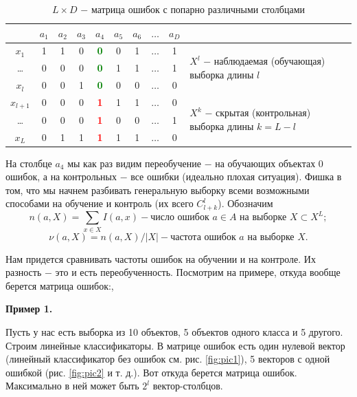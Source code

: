 \begin{table}[hbt!]
    \begin{tabular}{c|cccccccc|p{5cm}}
            & $a_1$ & $a_2$ & $a_3$ & $a_4$ & $a_5$ & $a_6$ & $\dots$ & $a_D$ & \\
    \hline
    $x_1$     & 1   & 1   & 0   & \textcolor{green}{\textbf{0}} & 0   & 1   & $\dots$ & 1   & \multirow{3}{*}{\parbox{5cm}{$X^l$ $-$ наблюдаемая (обучающая) выборка длины $l$}} \\
    \dots   & 0   & 0   & 0   & \textcolor{green}{\textbf{0}} & 1   & 1   & $\dots$ & 1   & \\
    $x_l$     & 0   & 0   & 1   & \textcolor{green}{\textbf{0}} & 0   & 0   & $\dots$ & 0   & \\
    \hline
    $x_{l+1}$ & 0   & 0   & 0   & \textcolor{red}{\textbf{1}}   & 1   & 1   & $\dots$ & 0   & \multirow{3}{*}{\parbox{5cm}{$X^k$ $-$ скрытая (контрольная) выборка длины $k=L-l$}} \\
    \dots   & 0   & 0   & 0   & \textcolor{red}{\textbf{1}}   & 0   & 0   & $\dots$ & 1   & \\
    $x_L$     & 0   & 1   & 1   & \textcolor{red}{\textbf{1}}   & 1   & 1   & $\dots$ & 0   & \\
    \end{tabular}
    \caption{$L \times D$ $-$ матрица ошибок с попарно различными столбцами}
\end{table}

На столбце $a_4$ мы как раз видим переобучение $-$ на обучающих объектах 0 ошибок, а на контрольных $-$ все ошибки (идеально плохая ситуация). Фишка в том, что мы начнем разбивать генеральную выборку всеми возможными способами на обучение и контроль (их всего $C_{l+k}^l$). Обозначим
\begin{equation*}
    n(a, X)= \sum_{x \in X} I(a, x) - \text{число ошибок } a \in A \text{ на выборке } X \subset X^L;
\end{equation*}
\begin{equation*}
    \nu(a, X)= n(a, X)/ | X | - \text{частота ошибок } a \text{ на выборке } X.
\end{equation*}

Нам придется сравнивать частоты ошибок на обучении и на контроле. Их разность $-$ это и есть переобученность. Посмотрим на примере, откуда вообще берется матрица ошибок:, 

\textbf{Пример 1.}

Пусть у нас есть выборка из 10 объектов, 5 объектов одного класса и 5 другого. Строим линейные классификаторы. В матрице ошибок есть один нулевой вектор (линейный классификатор без ошибок см. рис. \ref{fig:pic1}), 5 векторов с одной ошибкой (рис. \ref{fig:pic2} и т. д.). Вот откуда берется матрица ошибок. Максимально в ней может быть $2^l$ вектор-столбцов.

